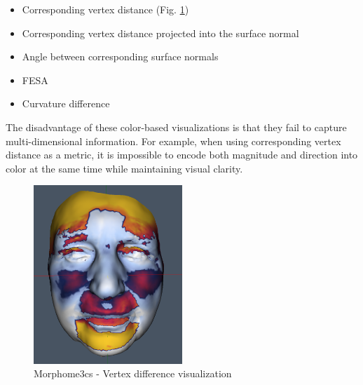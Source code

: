 
\begin{itemize}
\item Corresponding vertex distance (Fig. \ref{fig:morpho_example})
\item Corresponding vertex distance projected into the surface normal
\item Angle between corresponding surface normals
\item FESA\footnotemark
\item Curvature difference
\end{itemize}


The disadvantage of these color-based visualizations is that they fail to capture multi-dimensional information. For example, when using corresponding vertex distance as a metric, it is impossible to encode both magnitude and direction into color at the same time while maintaining visual clarity.

\begin{figure}[h]
\centering
\includegraphics[width=0.5\textwidth]{./img/morpho-example01.PNG}
\caption[Morphome3cs - Vertex difference visualization]{Morphome3cs - Vertex difference visualization}
\label{fig:morpho_example}
\end{figure}

